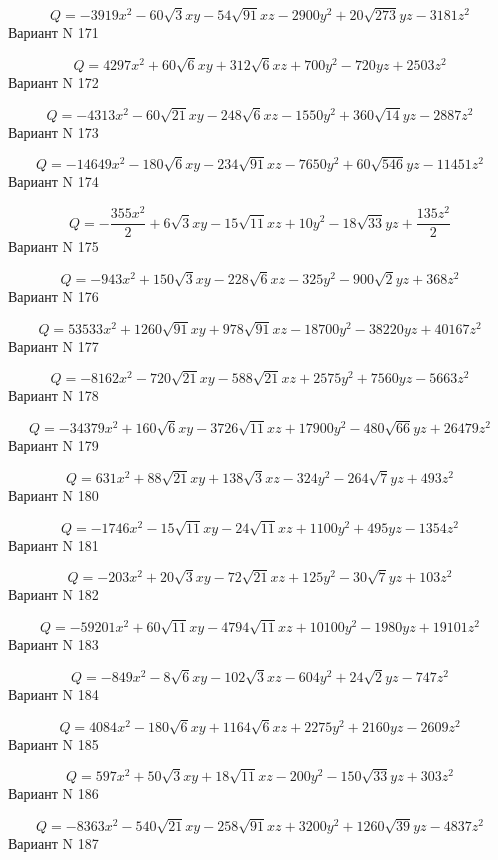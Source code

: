 \documentclass[11pt]{report}
\begin{document}
$$Q = - 3919 x^{2} - 60 \sqrt{3} x y - 54 \sqrt{91} x z - 2900 y^{2} + 20 \sqrt{273} y z - 3181 z^{2}$$Вариант N 171

$$Q = 4297 x^{2} + 60 \sqrt{6} x y + 312 \sqrt{6} x z + 700 y^{2} - 720 y z + 2503 z^{2}$$Вариант N 172

$$Q = - 4313 x^{2} - 60 \sqrt{21} x y - 248 \sqrt{6} x z - 1550 y^{2} + 360 \sqrt{14} y z - 2887 z^{2}$$Вариант N 173

$$Q = - 14649 x^{2} - 180 \sqrt{6} x y - 234 \sqrt{91} x z - 7650 y^{2} + 60 \sqrt{546} y z - 11451 z^{2}$$Вариант N 174

$$Q = - \frac{355 x^{2}}{2} + 6 \sqrt{3} x y - 15 \sqrt{11} x z + 10 y^{2} - 18 \sqrt{33} y z + \frac{135 z^{2}}{2}$$Вариант N 175

$$Q = - 943 x^{2} + 150 \sqrt{3} x y - 228 \sqrt{6} x z - 325 y^{2} - 900 \sqrt{2} y z + 368 z^{2}$$Вариант N 176

$$Q = 53533 x^{2} + 1260 \sqrt{91} x y + 978 \sqrt{91} x z - 18700 y^{2} - 38220 y z + 40167 z^{2}$$Вариант N 177

$$Q = - 8162 x^{2} - 720 \sqrt{21} x y - 588 \sqrt{21} x z + 2575 y^{2} + 7560 y z - 5663 z^{2}$$Вариант N 178

$$Q = - 34379 x^{2} + 160 \sqrt{6} x y - 3726 \sqrt{11} x z + 17900 y^{2} - 480 \sqrt{66} y z + 26479 z^{2}$$Вариант N 179

$$Q = 631 x^{2} + 88 \sqrt{21} x y + 138 \sqrt{3} x z - 324 y^{2} - 264 \sqrt{7} y z + 493 z^{2}$$Вариант N 180

$$Q = - 1746 x^{2} - 15 \sqrt{11} x y - 24 \sqrt{11} x z + 1100 y^{2} + 495 y z - 1354 z^{2}$$Вариант N 181

$$Q = - 203 x^{2} + 20 \sqrt{3} x y - 72 \sqrt{21} x z + 125 y^{2} - 30 \sqrt{7} y z + 103 z^{2}$$Вариант N 182

$$Q = - 59201 x^{2} + 60 \sqrt{11} x y - 4794 \sqrt{11} x z + 10100 y^{2} - 1980 y z + 19101 z^{2}$$Вариант N 183

$$Q = - 849 x^{2} - 8 \sqrt{6} x y - 102 \sqrt{3} x z - 604 y^{2} + 24 \sqrt{2} y z - 747 z^{2}$$Вариант N 184

$$Q = 4084 x^{2} - 180 \sqrt{6} x y + 1164 \sqrt{6} x z + 2275 y^{2} + 2160 y z - 2609 z^{2}$$Вариант N 185

$$Q = 597 x^{2} + 50 \sqrt{3} x y + 18 \sqrt{11} x z - 200 y^{2} - 150 \sqrt{33} y z + 303 z^{2}$$Вариант N 186

$$Q = - 8363 x^{2} - 540 \sqrt{21} x y - 258 \sqrt{91} x z + 3200 y^{2} + 1260 \sqrt{39} y z - 4837 z^{2}$$Вариант N 187
\end{document}
